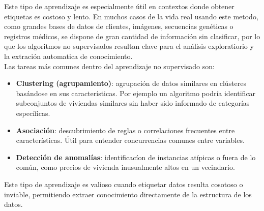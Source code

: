 \documentclass[11pt]{article} %
\begin{document}
\begin{itemize}
    Este tipo de aprendizaje es especialmente útil en contextos donde obtener etiquetas es costoso y lento. En muchos casos de la vida real usando este metodo, como grandes bases de datos de clientes, imágenes, secuencias genéticas o registros médicos, se dispone de gran cantidad de informacíón sin clasificar, por lo que los algoritmos no supervisados resultan clave para el análisis exploratiorio y la extración automatica de conocimiento. \\[2pt]
    Las tareas más comunes dentro del aprendizaje no supervisado son:
    \begin{itemize}
        \item \textbf{Clustering (agrupamiento)}: agrupación de datos similares en clústeres basándose en sus características. Por ejemplo un algoritmo podría identificar subconjuntos de viviendas similares sin haber sido informado de categorías específicas.
        \item\textbf{Asociación}: descubrimiento de reglas o correlaciones frecuentes entre características. Útil para entender concurrencias comunes entre variables.
        \item\textbf{Detección de anomalías}: identificacíon de instancias atípicas o fuera de lo común, como precios de vivienda inusualmente altos en un vecindario.
    \end{itemize}
    Este tipo de aprendizaje es valioso cuando etiquetar datos resulta cosotoso o inviable, permitiendo extraer conocimiento directamente de la estructura de los datos.
\end{itemize}
\end{document}
